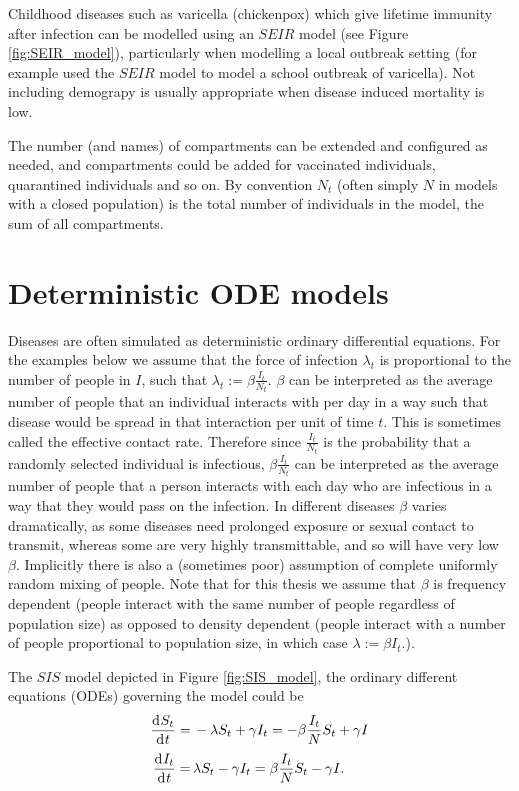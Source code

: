 Childhood diseases such as varicella (chickenpox) which give lifetime immunity
after infection can be modelled using an $SEIR$ model (see Figure
\ref{fig:SEIR_model}), particularly when modelling a local outbreak setting
(for example \cite{zha_research_2020} used the $SEIR$ model to model a school
outbreak of varicella). Not including demograpy is usually appropriate when
disease induced mortality is low.

The number (and names) of compartments can be extended and configured as
needed, and compartments could be added for vaccinated individuals, quarantined
individuals and so on. By convention $N_t$ (often simply $N$ in models with a
closed population) is the total number of individuals in the model, the sum of
all compartments.

\section{Deterministic ODE models}

Diseases are often simulated as deterministic ordinary differential equations.
For the examples below we assume that the force of infection $\lambda_t$ is
proportional to the number of people in $I$, such that
$\lambda_t := \beta \frac{I_t}{N_t}.$ $\beta$ can be interpreted as the average
number of people that an individual interacts with per day in a way such that
disease would be spread in that interaction per unit of time $t$. This is
sometimes called the effective contact rate. Therefore since $\frac{I_t}{N_t}$
is the probability that a randomly selected individual is infectious,
$\beta \frac{I_t}{N_t}$ can be interpreted as the average number of people that
a person interacts with each day who are infectious in a way that they would
pass on the infection. In different diseases $\beta$ varies dramatically, as
some diseases need prolonged exposure or sexual contact to transmit, whereas
some are very highly transmittable, and so will have very low $\beta.$
Implicitly there is also a (sometimes poor) assumption of complete uniformly
random mixing of people. Note that for this thesis we assume that $\beta$ is
frequency dependent (people interact with the same number of people regardless
of population size) as opposed to density dependent (people interact with a
number of people proportional to population size, in which case
$\lambda := \beta I_t.$).

The $SIS$ model depicted in Figure \ref{fig:SIS_model}, the ordinary different
equations (ODEs) governing the model could be \begin{align}
    \frac{\diff S_t}{\diff t} = & \, -\lambda S_t + \gamma I_t = -\beta \frac{I_t}{N}S_t + \gamma I\label{eq:SIS_1} \\
    \frac{\diff I_t}{\diff t} = & \, \lambda S_t - \gamma I_t = \beta \frac{I_t}{N}S_t - \gamma I\label{eq:SIS_2}.
\end{align}


